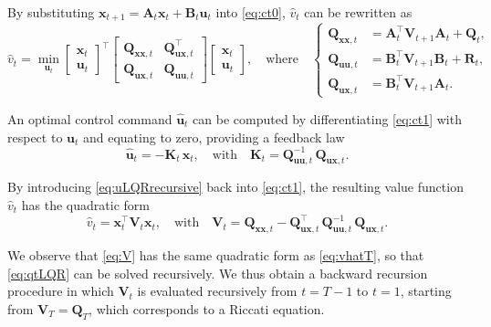 \documentclass[10pt,a4paper]{article} %
\newcommand{\trsp}{{\scriptscriptstyle\top}}
\begin{document}
By substituting $\bm{x}_{{t+1}}=\bm{A}_t\bm{x}_t+\bm{B}_t\bm{u}_t$ into \eqref{eq:ct0}, $\hat{v}_t$ can be rewritten as
\begin{equation}
	\hat{v}_t = \min_{\bm{u}_t} 
	\begin{bmatrix} \bm{x}_t \\ \bm{u}_t \end{bmatrix}^\trsp
	\begin{bmatrix} \bm{Q}_{\bm{x}\bm{x},t} & \bm{Q}_{\bm{u}\bm{x},t}^\trsp \\ \bm{Q}_{\bm{u}\bm{x},t} & \bm{Q}_{\bm{u}\bm{u},t} \end{bmatrix}
	\begin{bmatrix} \bm{x}_t \\ \bm{u}_t \end{bmatrix},
	\quad\text{where}\quad
	\left\{
	\begin{aligned}
		\bm{Q}_{\bm{x}\bm{x},t} &= \bm{A}_t^\trsp \bm{V}_{t+1} \bm{A}_t + \bm{Q}_t, \\
		\bm{Q}_{\bm{u}\bm{u},t} &= \bm{B}_t^\trsp \bm{V}_{t+1} \bm{B}_t + \bm{R}_t, \\
		\bm{Q}_{\bm{u}\bm{x},t} &= \bm{B}_t^\trsp \bm{V}_{t+1} \bm{A}_t.
	\end{aligned}
	\right.
	\label{eq:ct1}
\end{equation}

An optimal control command $\bm{\hat{u}}_t$ can be computed by differentiating \eqref{eq:ct1} with respect to $\bm{u}_t$ and equating to zero, providing a feedback law
\begin{equation}
	\bm{\hat{u}}_t = -\bm{K}_t \, \bm{x}_t, 
	\quad\text{with}\quad
	\bm{K}_t = \bm{Q}_{\bm{u}\bm{u},t}^{-1} \, \bm{Q}_{\bm{u}\bm{x},t}. 
	\label{eq:uLQRrecursive}
\end{equation}

By introducing \eqref{eq:uLQRrecursive} back into \eqref{eq:ct1}, the resulting value function $\hat{v}_t$ has the quadratic form
\begin{equation}
	\hat{v}_t = \bm{x}_t^\trsp \bm{V}_t \bm{x}_t, 
	\quad\text{with}\quad
	\bm{V}_t = \bm{Q}_{\bm{x}\bm{x},t} - \bm{Q}_{\bm{u}\bm{x},t}^\trsp \, \bm{Q}_{\bm{u}\bm{u},t}^{-1} \, \bm{Q}_{\bm{u}\bm{x},t}.
	\label{eq:V}
\end{equation}

We observe that \eqref{eq:V} has the same quadratic form as \eqref{eq:vhatT}, so that \eqref{eq:qtLQR} can be solved recursively. We thus obtain a backward recursion procedure in which $\bm{V}_t$ is evaluated recursively from $t=T-1$ to $t=1$, starting from $\bm{V}_T=\bm{Q}_T$, which corresponds to a Riccati equation. 
\end{document}
